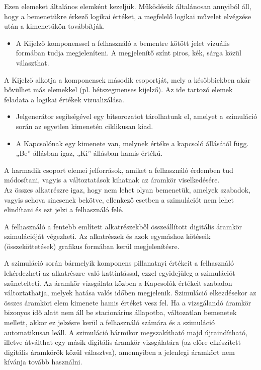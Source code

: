 Ezen elemeket általános elemként kezeljük. Működésük általánosan annyiból áll, hogy a bemenetükre érkező logikai értéket, a megfelelő logikai művelet elvégzése után a kimenetükön továbbítják.

\begin{itemize}
\item A Kijelző komponenssel a felhasználó a bementre kötött jelet vizuális formában tudja megjeleníteni. A megjelenítő színt piros, kék, sárga közül választhat.
\end{itemize}
	
A Kijelző alkotja a komponensek második csoportját, mely a későbbiekben akár bővülhet más elemekkel (pl. hétszegmenses kijelző). Az ide tartozó elemek feladata a logikai értékek vizualizálása.

\begin{itemize}
\item Jelgenerátor segítségével egy bitsorozatot tárolhatunk el, amelyet a szimuláció során az egyetlen kimenetén ciklikusan kiad.
\item A Kapcsolónak egy kimenete van, melynek értéke a kapcsoló állásától függ. „Be” állásban igaz, „Ki” állásban hamis értékű.
\end{itemize}

A harmadik csoport elemei jelforrások, amiket a felhasználó érdemben tud módosítani, vagyis a változtatások kihatnak az áramkör viselkedésére.\\

Az összes alkatrészre igaz, hogy nem lehet olyan bemenetük, amelyek szabadok, vagyis sehova sincsenek bekötve, ellenkező esetben a szimulációt nem lehet elindítani és ezt jelzi a felhasználó felé.

A felhasználó a fentebb említett alkatrészekből összeállított digitális áramkör szimulációját végezheti. Az alkatrészek és azok egymáshoz kötéseik (összeköttetések) grafikus formában kerül megjelenítésre.

A szimuláció során bármelyik komponens pillanatnyi értékeit a felhasználó lekérdezheti az alkatrészre való kattintással, ezzel egyidejűleg a szimulációt szünetelteti. Az áramkör vizsgálata közben a Kapcsolók értékeit szabadon változtathatja, melyek hatása valós időben megjelenik. Szimuláció elkezdésekor az összes áramköri elem kimenete hamis értéket vesz fel. Ha a vizsgálandó áramkör bizonyos idő alatt nem áll be stacionárius állapotba, változatlan bemenetek mellett, akkor ez jelzésre kerül a felhasználó számára és a szimuláció automatikusan leáll. A szimuláció bármikor megszakítható majd újraindítható, illetve átválthat egy másik digitális áramkör vizsgálatára (az előre elkészített digitális áramkörök közül választva), amennyiben a jelenlegi áramkört nem kívánja tovább használni.

